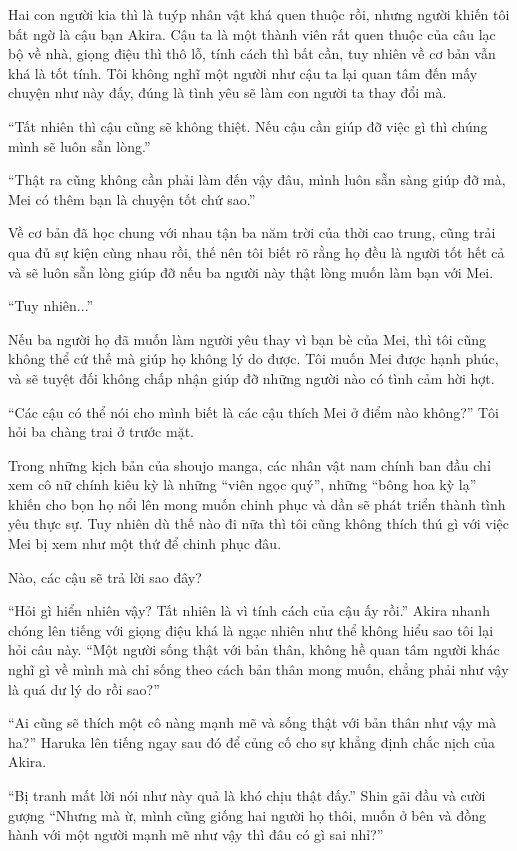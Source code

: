 {Hai con người kia thì là tuýp nhân vật khá quen thuộc rồi, nhưng người
khiến tôi bất ngờ là cậu bạn Akira. Cậu ta là một thành viên rất quen
thuộc của câu lạc bộ về nhà, giọng điệu thì thô lỗ, tính cách thì bất
cần, tuy nhiên về cơ bản vẫn khá là tốt tính. Tôi không nghĩ một người
như cậu ta lại quan tâm đến mấy chuyện như này đấy, đúng là tình yêu sẽ
làm con người ta thay đổi mà.

``Tất nhiên thì cậu cũng sẽ không thiệt. Nếu cậu cần giúp đỡ việc gì thì
chúng mình sẽ luôn sẵn lòng.''

``Thật ra cũng không cần phải làm đến vậy đâu, mình luôn sẵn sàng giúp
đỡ mà, Mei có thêm bạn là chuyện tốt chứ sao.''

Về cơ bản đã học chung với nhau tận ba năm trời của thời cao trung, cũng
trải qua đủ sự kiện cùng nhau rồi, thế nên tôi biết rõ rằng họ đều là
người tốt hết cả và sẽ luôn sẵn lòng giúp đỡ nếu ba người này thật lòng
muốn làm bạn với Mei.

``Tuy nhiên...''

Nếu ba người họ đã muốn làm người yêu thay vì bạn bè của Mei, thì tôi
cũng không thể cứ thế mà giúp họ không lý do được. Tôi muốn Mei được
hạnh phúc, và sẽ tuyệt đối không chấp nhận giúp đỡ những người nào có
tình cảm hời hợt.

``Các cậu có thể nói cho mình biết là các cậu thích Mei ở điểm nào
không?'' Tôi hỏi ba chàng trai ở trước mặt.

Trong những kịch bản của shoujo manga, các nhân vật nam chính ban đầu
chỉ xem cô nữ chính kiêu kỳ là những ``viên ngọc quý'', những ``bông hoa
kỳ lạ'' khiến cho bọn họ nổi lên mong muốn chinh phục và dần sẽ phát
triển thành tình yêu thực sự. Tuy nhiên dù thế nào đi nữa thì tôi cũng
không thích thú gì với việc Mei bị xem như một thứ để chinh phục đâu.

Nào, các cậu sẽ trả lời sao đây?

``Hỏi gì hiển nhiên vậy? Tất nhiên là vì tính cách của cậu ấy rồi.''
Akira nhanh chóng lên tiếng với giọng điệu khá là ngạc nhiên như thể
không hiểu sao tôi lại hỏi câu này. ``Một người sống thật với bản thân,
không hề quan tâm người khác nghĩ gì về mình mà chỉ sống theo cách bản
thân mong muốn, chẳng phải như vậy là quá dư lý do rồi sao?''

``Ai cũng sẽ thích một cô nàng mạnh mẽ và sống thật với bản thân như vậy
mà ha?'' Haruka lên tiếng ngay sau đó để củng cố cho sự khẳng định chắc
nịch của Akira.

``Bị tranh mất lời nói như này quả là khó chịu thật đấy.'' Shin gãi đầu
và cười gượng ``Nhưng mà ừ, mình cũng giống hai người họ thôi, muốn ở
bên và đồng hành với một người mạnh mẽ như vậy thì đâu có gì sai nhỉ?''

}
